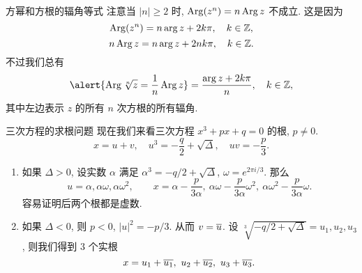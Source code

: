 \begin{frame}{方幂和方根的辐角等式}
	\onslide<+->
	注意当 $|n|\ge 2$ 时, \alert{$\operatorname{Arg}(z^n)=n\operatorname{Arg} z$ 不成立}.
	\onslide<+->
	这是因为
	\[\operatorname{Arg}(z^n)=n\arg z+2k\pi,\quad k\in{\mathbb{Z}},\]
	\[n\operatorname{Arg} z=n\arg z+2nk\pi,\quad k\in{\mathbb{Z}}.\]
	\onslide<+->
	不过我们总有
	\[\alert{\Arg \sqrt[n]z=\dfrac1n\Arg z}=\dfrac{\arg z+2k\pi}n,\quad k\in\BZ,\]
	\onslide<+->
	其中左边表示 $z$ 的所有 $n$ 次方根的所有辐角.
\end{frame}


\begin{frame}{三次方程的求根问题\noexer}
	\onslide<+->
	现在我们来看三次方程 $x^3+px+q=0$ 的根, $p\neq 0$.
	\onslide<+->
	\[x=u+v,\quad u^3=-\frac q2+\sqrt{\Delta},\quad uv=-\frac p3.\]
	\begin{enumerate}
		\item 如果 $\Delta>0$, 设实数 $\alpha$ 满足 $\alpha^3=-q/2+\sqrt{\Delta}$, $\omega=e^{2\pi i/3}$.
			\onslide<+->
			那么
			\[u=\alpha,\alpha\omega,\alpha\omega^2,\qquad
			x=\alpha-\frac p{3\alpha},\ \alpha\omega-\frac p{3\alpha} \omega^2,\ \alpha\omega^2-\frac p{3\alpha} \omega.\]
			\onslide<+->
			容易证明后两个根都是虚数.
		\item 如果 $\Delta<0$, 则 $p<0$, $|u|^2=-p/3$. 从而 $v=\overline u$.
			\onslide<+->设 $\sqrt[3]{-q/2+\sqrt{\Delta}}=u_1,u_2,u_3$,
			\onslide<+->
			则我们得到 $3$ 个实根
			\[x=u_1+\ov{u_1},\ u_2+\ov{u_2},\ u_3+\ov{u_3}.\]
	\end{enumerate}
\end{frame}

